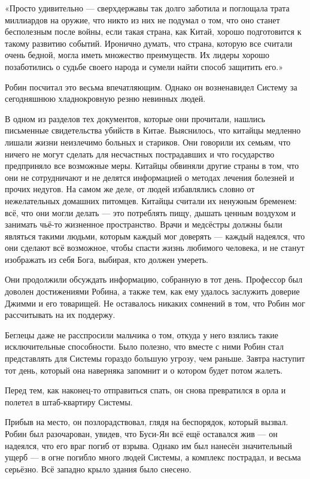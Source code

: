 \documentclass[a4paper,12pt]{book}
\begin{document}
«Просто удивительно — сверхдержавы так долго заботила и поглощала трата миллиардов на оружие, что никто из них не подумал о том, что оно станет бесполезным после войны, если такая страна, как Китай, хорошо подготовится к такому развитию событий. Иронично думать, что страна, которую все считали очень бедной, могла иметь множество преимуществ. Их лидеры хорошо позаботились о судьбе своего народа и сумели найти способ защитить его.»
\par
Робин посчитал это весьма впечатляющим. Однако он возненавидел Систему за сегодняшнюю хладнокровную резню невинных людей.\\
\par
В одном из разделов тех документов, которые они прочитали, нашлись письменные свидетельства убийств в Китае. Выяснилось, что китайцы медленно лишали жизни неизлечимо больных и стариков. Они говорили их семьям, что ничего не могут сделать для несчастных пострадавших и что государство предприняло все возможные меры. Китайцы обвиняли другие страны в том, что они не сотрудничают и не делятся информацией о методах лечения болезней и прочих недугов. На самом же деле, от людей избавлялись словно от нежелательных домашних питомцев. Китайцы считали их ненужным бременем: всё, что они могли делать — это потреблять пищу, дышать ценным воздухом и занимать чьё-то жизненное пространство. Врачи и медсёстры должны были являться такими людьми, которым каждый мог доверять — каждый надеялся, что они сделают всё возможное, чтобы спасти жизнь любимого человека, и не станут изображать из себя Бога, выбирая, кто должен умереть.\\
\par
Они продолжили обсуждать информацию, собранную в тот день. Профессор был доволен достижениями Робина, а также тем, как ему удалось заслужить доверие Джимми и его товарищей. Не оставалось никаких сомнений в том, что Робин мог рассчитывать на их поддержу.
\par
Беглецы даже не расспросили мальчика о том, откуда у него взялись такие исключительные способности. Было полезно, что вместе с ними Робин стал представлять для Системы гораздо большую угрозу, чем раньше. Завтра наступит тот день, который она наверняка запомнит и о котором будет потом жалеть.
\par
Перед тем, как наконец-то отправиться спать, он снова превратился в орла и полетел в штаб-квартиру Системы.
\par
Прибыв на место, он позлорадствовал, глядя на беспорядок, который вызвал. Робин был разочарован, увидев, что Буси-Ян всё ещё оставался жив — он надеялся, что его враг погиб от взрыва. Однако им был нанесён значительный ущерб — в огне погибло много людей Системы, а комплекс пострадал, и весьма серьёзно. Всё западно крыло здания было снесено.
\end{document}
